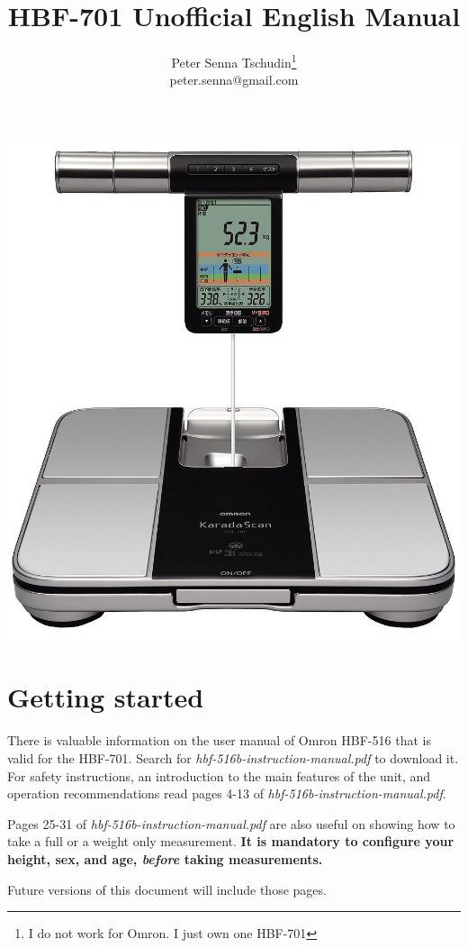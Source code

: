 \documentclass[10pt]{article}
\title{HBF-701 Unofficial English Manual}
\author{Peter Senna Tschudin\footnote{I do not work for Omron. I just own one
HBF-701}\\ {\small peter.senna@gmail.com}}
\begin{document}
\maketitle
\begin{center}
\vspace{15pt}
\includegraphics[width=0.8\linewidth]{images/hbf701.jpg}
\end{center}
\section{Getting started}
\label{sec:starting}
There is valuable information on the user manual of Omron HBF-516 that is valid
for the HBF-701. Search for \textit{hbf-516b-instruction-manual.pdf} to download
it. For safety instructions, an introduction to the main features of the unit,
and operation recommendations read pages 4-13 of
\textit{hbf-516b-instruction-manual.pdf}.

Pages 25-31 of \textit{hbf-516b-instruction-manual.pdf} are also useful on
showing how to take a full or a weight only measurement. \textbf{It is mandatory
to configure your height, sex, and age, \textit{before} taking measurements.}

Future versions of this document will include those pages.
\end{document}
